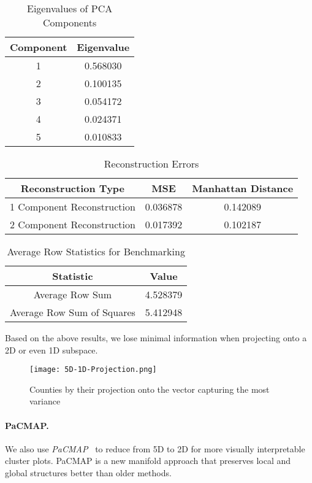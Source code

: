 \documentclass[12pt]{article}
\begin{document}
\begin{table}[h!]
\centering
\begin{tabular}{|c|c|}
\hline
\textbf{Component} & \textbf{Eigenvalue} \\ \hline
1 & 0.568030 \\ \hline
2 & 0.100135 \\ \hline
3 & 0.054172 \\ \hline
4 & 0.024371 \\ \hline
5 & 0.010833 \\ \hline
\end{tabular}
\caption{Eigenvalues of PCA Components}
\label{tab:eigenvalues}
\end{table}

\begin{table}[h!]
\centering
\begin{tabular}{|c|c|c|}
\hline
\textbf{Reconstruction Type} & \textbf{MSE} & \textbf{Manhattan Distance} \\ \hline
1 Component Reconstruction & 0.036878 & 0.142089 \\ \hline
2 Component Reconstruction & 0.017392 & 0.102187 \\ \hline
\end{tabular}
\caption{Reconstruction Errors}
\label{tab:reconstruction_errors}
\end{table}

\begin{table}[h!]
\centering
\begin{tabular}{|c|c|}
\hline
\textbf{Statistic} & \textbf{Value} \\ \hline
Average Row Sum & 4.528379 \\ \hline
Average Row Sum of Squares & 5.412948 \\ \hline
\end{tabular}
\caption{Average Row Statistics for Benchmarking}
\label{tab:average_row_stats}
\end{table}

Based on the above results, we lose minimal information when projecting onto a 2D or even 1D subspace.

\begin{figure}[H]
    \centering
    \texttt{[image: 5D-1D-Projection.png]}
    \caption{Counties by their projection onto the vector capturing the most variance}
    \label{fig:enter-label}
\end{figure}


\paragraph{PaCMAP.}
We also use \emph{PaCMAP}~\cite{PacMapPaper} to reduce from 5D to 2D for more visually interpretable cluster plots. PaCMAP is a new manifold approach that preserves local and global structures better than older methods.
\end{document}
